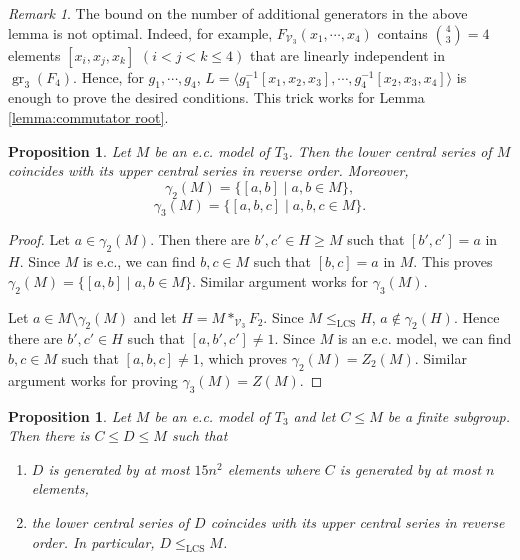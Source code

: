 \documentclass[11pt,reqno]{article}
\newtheorem{proposition}[theorem]{Proposition}
\theoremstyle{definition}
\theoremstyle{remark}
\newtheorem{remark}[theorem]{Remark}
\DeclareMathOperator{\gr}{gr}
\newcommand{\LCS}{\mathrm{LCS}}
\begin{document}
\begin{remark}
    The bound on the number of additional generators in the above lemma is not optimal.
    Indeed, for example, $F_{\mathcal V_3}(x_1,\cdots, x_4)$ contains $\binom 43=4$ elements $[x_i,x_j,x_k]$ $(i<j<k\leq 4)$ that are linearly independent in $\gr_3(F_{4})$.
    Hence, for $g_1,\cdots, g_4$, $L=\langle g_1^{-1}[x_1,x_2,x_3],\cdots, g_4^{-1}[x_2,x_3,x_4]\rangle$ is enough to prove the desired conditions.
    This trick works for Lemma \ref{lemma:commutator root}. 
\end{remark}


\begin{proposition}\label{proposition:structure of e.c. model}
    Let $M$ be an e.c. model of $T_3$. Then the lower central series of $M$
    coincides with its upper central series in reverse order.
    Moreover,
    \[
        \gamma_2(M)=\{[a,b]\mid a,b\in M\},
    \]
    \[
        \gamma_3(M)=\{[a,b,c]\mid a,b,c\in M\}.
    \]
\end{proposition}

\begin{proof}
    Let $a\in \gamma_2(M)$. Then there are $b',c'\in H\geq M$ such that $[b',c']=a$ in $H$.
    Since $M$ is e.c., we can find $b,c\in M$ such that $[b,c]=a$ in $M$.
    This proves $\gamma_2(M)=\{[a,b]\mid a,b\in M\}$.
    Similar argument works for $\gamma_3(M)$.
    
    Let $a\in M\setminus\gamma_2(M)$ and let $H=M*_{\mathcal V_3}F_2$.
    Since $M\leq_\LCS H$, $a\not\in \gamma_2(H)$.
    Hence there are $b',c'\in H$ such that $[a,b',c']\neq 1$. 
    Since $M$ is an e.c. model, we can find $b,c\in M$ such that $[a,b,c]\neq 1$, which proves $\gamma_2(M)=Z_2(M)$.
    Similar argument works for proving $\gamma_3(M)=Z(M)$.
\end{proof}



\begin{proposition}\label{proposition:bdd LCS}
    Let $M$ be an e.c. model of $T_3$ and let $C\leq M$ be a finite
    subgroup.
    Then there is $C\leq D\leq M$ such that 
    \begin{enumerate}
        \item $D$ is generated by at most $15n^2$ elements where $C$ is generated by at most $n$ elements,
        \item the lower central series of $D$ coincides with its upper central series in reverse order. In particular, $D\leq_\LCS M$. 
    \end{enumerate}
\end{proposition}
\end{document}
